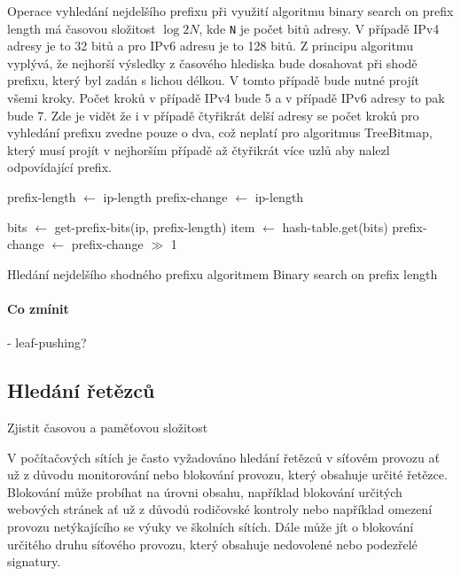 Operace vyhledání nejdelšího prefixu při využití algoritmu binary search on prefix length má časovou
složitost $\log{2}{N}$, kde \texttt{N} je počet bitů adresy. V případě IPv4 adresy je to 32 bitů a pro IPv6
adresu je to 128 bitů. Z principu algoritmu vyplývá, že nejhorší výsledky z časového hlediska bude dosahovat
při shodě prefixu, který byl zadán s lichou délkou. V tomto případě bude nutné projít všemi kroky.
Počet kroků v případě IPv4 bude 5 a v případě IPv6 adresy to pak bude 7.
Zde je vidět že i v případě čtyřikrát delší adresy se počet kroků pro vyhledání prefixu zvedne pouze o dva,
což neplatí pro algoritmus TreeBitmap, který musí projít v nejhorším případě až čtyřikrát více
uzlů aby nalezl odpovídající prefix.
\cite{bspl}

\begin{algorithm}
	prefix-length $\leftarrow$ ip-length\;
	prefix-change $\leftarrow$ ip-length\;
	{
		bits $\leftarrow$ get-prefix-bits(ip, prefix-length)\;
		item $\leftarrow$ hash-table.get(bits)\;
		prefix-change $\leftarrow$ prefix-change $\gg$ 1\;

	}
	\caption{Hledání nejdelšího shodného prefixu algoritmem Binary search on prefix length}
\end{algorithm}

\paragraph{Co zmínit}
- leaf-pushing?

\subsection{Hledání řetězců} %

Zjistit časovou a paměťovou složitost

V počítačových sítích je často vyžadováno hledání řetězců v síťovém provozu ať už z důvodu monitorování
nebo blokování provozu, který obsahuje určité řetězce. Blokování může probíhat na úrovni obsahu, například
blokování určitých webových stránek ať už z důvodů rodičovské kontroly nebo například omezení provozu
netýkajícího se výuky ve školních sítích. Dále může jít o blokování určitého druhu síťového provozu,
který obsahuje nedovolené nebo podezřelé signatury.

